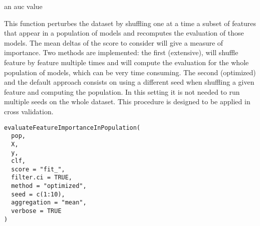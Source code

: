 \documentclass[a4paper]{book}
\begin{document}
%
\begin{Value}
an auc value
\end{Value}
%
\begin{Description}
This function perturbes the dataset by shuffling one at a time a subset of features that appear in a population of models
and recomputes the evaluation of those models. The mean deltas of the score to consider will give a measure of importance. Two methods 
are implemented: the first (extensive), will shuffle feature by feature multiple times and will compute the evaluation for the whole 
population of models, which can be very time consuming. The second (optimized) and the default approach consists on using a different 
seed when shuffling a given feature and computing the population. In this setting it is not needed to run multiple seeds on the whole 
dataset. This procedure is designed to be applied in cross validation.
\end{Description}
%
\begin{Usage}
\begin{verbatim}
evaluateFeatureImportanceInPopulation(
  pop,
  X,
  y,
  clf,
  score = "fit_",
  filter.ci = TRUE,
  method = "optimized",
  seed = c(1:10),
  aggregation = "mean",
  verbose = TRUE
)
\end{verbatim}
\end{Usage}
%
\end{document}
